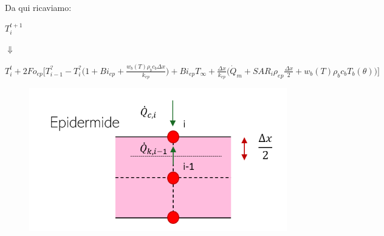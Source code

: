 Da qui ricaviamo:
\begin{center}
	$T_i ^{t+1}$
 \begin{center}
    \begin{center}
        $\Downarrow$
    \end{center}
 \end{center}
 $T_i ^t + 2 Fo_{ep} \Bigg[ T_{i-1} ^? - T_i ^? \Big(1 + Bi_{ep} +  \frac{ w_b (T) \rho _b c_b \Delta x }{k_{ep}} \Big) + Bi_{ep} T_{\infty} +  \frac{\Delta x }{k_{ep}} \Big(\Dot{Q} _{m} +  SAR_i \rho _{ep} \frac{\Delta x}{2} + w_b (T) \rho _b c_b T_b(\theta)\Big) \Bigg]$
\end{center}


\begin{figure}[H]
    \centering
    \includegraphics[width=.6\textwidth]{Immagini/Nodi/nodo1.png} 
    \label{nodo1}
\end{figure}


